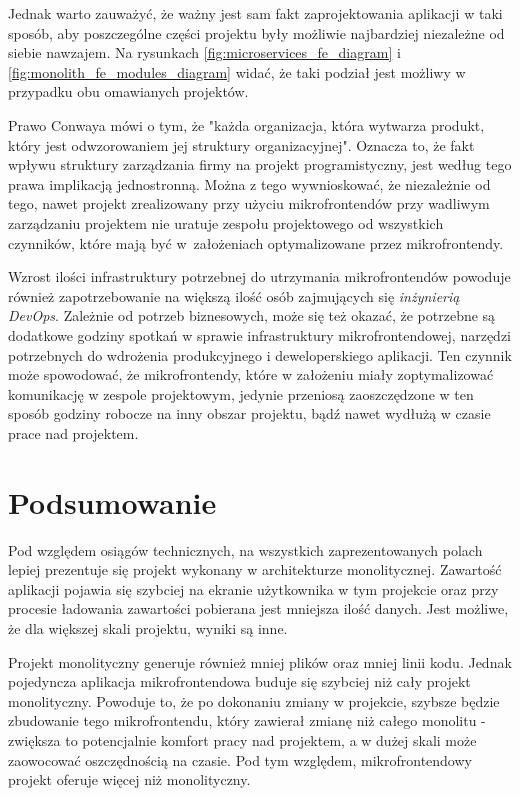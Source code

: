\documentclass{SGGW-thesis}
\begin{document}
{  Jednak warto zauważyć, że ważny jest sam fakt zaprojektowania aplikacji w taki sposób, aby poszczególne części projektu były możliwie najbardziej niezależne od siebie nawzajem. Na rysunkach \cref{fig:microservices_fe_diagram} i \cref{fig:monolith_fe_modules_diagram} widać, że taki podział jest możliwy w przypadku obu omawianych projektów.

  Prawo Conwaya \cite{conway} mówi o tym, że "każda organizacja, która wytwarza produkt, który jest odwzorowaniem jej struktury organizacyjnej". Oznacza to, że fakt wpływu struktury zarządzania firmy na projekt programistyczny, jest według tego prawa implikacją jednostronną. Można z tego wywnioskować, że niezależnie od tego, nawet projekt zrealizowany przy użyciu mikrofrontendów przy wadliwym zarządzaniu projektem nie uratuje zespołu projektowego od wszystkich czynników, które mają być w~założeniach optymalizowane przez mikrofrontendy.

  Wzrost ilości infrastruktury potrzebnej do utrzymania mikrofrontendów powoduje również zapotrzebowanie na większą ilość osób zajmujących się \textit{inżynierią DevOps}. Zależnie od potrzeb biznesowych, może się też okazać, że potrzebne są dodatkowe godziny spotkań w sprawie infrastruktury mikrofrontendowej, narzędzi potrzebnych do wdrożenia produkcyjnego i deweloperskiego aplikacji. Ten czynnik może spowodować, że mikrofrontendy, które w założeniu miały zoptymalizować komunikację w zespole projektowym, jedynie przeniosą zaoszczędzone w ten sposób godziny robocze na inny obszar projektu, bądź nawet wydłużą w czasie prace nad projektem.

\chapter{Podsumowanie}
Pod względem osiągów technicznych, na wszystkich zaprezentowanych polach lepiej prezentuje się projekt wykonany w architekturze monolitycznej. Zawartość aplikacji pojawia się szybciej na ekranie użytkownika w tym projekcie oraz przy procesie ładowania zawartości pobierana jest mniejsza ilość danych. Jest możliwe, że dla większej skali projektu, wyniki są inne.

Projekt monolityczny generuje również mniej plików oraz mniej linii kodu. Jednak pojedyncza aplikacja mikrofrontendowa buduje się szybciej niż cały projekt monolityczny. Powoduje to, że po dokonaniu zmiany w projekcie, szybsze będzie zbudowanie tego mikrofrontendu, który zawierał zmianę niż całego monolitu - zwiększa to potencjalnie komfort pracy nad projektem, a w dużej skali może zaowocować oszczędnością na czasie. Pod tym względem, mikrofrontendowy projekt oferuje więcej niż monolityczny.

}
\end{document}
